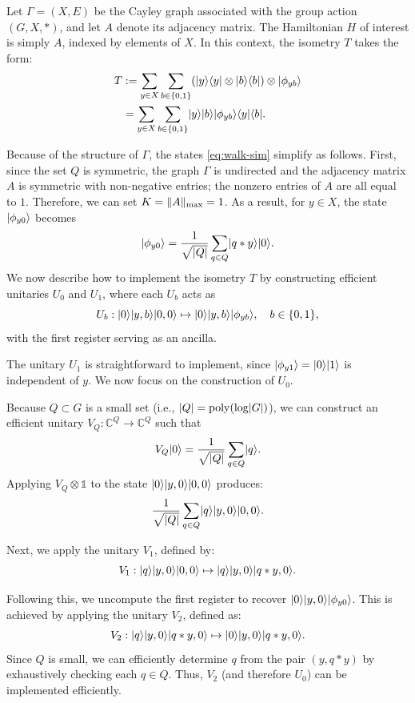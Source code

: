 \documentclass[12pt]{report}
\begin{document}
Let \( \Gamma = (X, E) \) be the Cayley graph associated with the group action \( (G, X, *) \), and let \( A \) denote its adjacency matrix. The Hamiltonian \( H \) of interest is simply \( A \), indexed by elements of \( X \). In this context, the isometry \( T \) takes the form:
\begin{align*}
T
& := \sum_{y \in X} \sum_{b \in \{0, 1\}} (\lvert y\rangle\langle y\rvert \otimes \lvert b\rangle\langle b\rvert) \otimes \lvert\phi_{yb}\rangle \\
& = \sum_{y \in X} \sum_{b \in \{0, 1\}} \lvert y\rangle \lvert b\rangle \lvert\phi_{yb}\rangle \langle y\rvert \langle b\rvert.
\end{align*}


Because of the structure of $\Gamma$, the states \eqref{eq:walk-sim} simplify as follows. First, since the set $Q$ is symmetric, the graph $\Gamma$ is undirected and the adjacency matrix $A$ is symmetric with non-negative entries; the nonzero entries of $A$ are all equal to $1$. Therefore, we can set $K = \lVert A\rVert_{\mathrm{max}} = 1$. As a result, for $y \in X$, the state $\lvert\phi_{y0}\rangle$ becomes
\[ \lvert\phi_{y0}\rangle = \frac{1}{\sqrt{\lvert Q\rvert}} \sum_{q \in Q} \lvert q * y\rangle \lvert0\rangle. \]
We now describe how to implement the isometry \( T \) by constructing efficient unitaries \( U_0 \) and \( U_1 \), where each \( U_b \) acts as
\[
U_b : \lvert0\rangle \lvert y, b\rangle \lvert0, 0\rangle \mapsto \lvert0\rangle \lvert y, b\rangle \lvert\phi_{yb}\rangle, \quad b \in \{0, 1\},
\]
with the first register serving as an ancilla.

The unitary \( U_1 \) is straightforward to implement, since \( \lvert\phi_{y1}\rangle = \lvert0\rangle \lvert1\rangle \) is independent of \( y \). We now focus on the construction of \( U_0 \).

Because \( Q \subset G \) is a small set (i.e., \( \lvert Q\rvert = \operatorname{poly}(\log \lvert G\rvert) \)), we can construct an efficient unitary \( V_Q : \mathbb{C}^Q \to \mathbb{C}^Q \) such that
\[
V_Q \lvert0\rangle = \frac{1}{\sqrt{\lvert Q\rvert}} \sum_{q \in Q} \lvert q\rangle.
\]
Applying \( V_Q \otimes \mathds{1} \) to the state \( \lvert0\rangle \lvert y, 0\rangle \lvert0, 0\rangle \) produces:
\[
\frac{1}{\sqrt{\lvert Q\rvert}} \sum_{q \in Q} \lvert q\rangle \lvert y, 0\rangle \lvert0, 0\rangle.
\]

Next, we apply the unitary \( V_1 \), defined by:
\[
V_1 : \lvert q\rangle \lvert y, 0\rangle \lvert0, 0\rangle \mapsto \lvert q\rangle \lvert y, 0\rangle \lvert q * y, 0\rangle.
\]

Following this, we uncompute the first register to recover \( \lvert0\rangle \lvert y, 0\rangle \lvert\phi_{y0}\rangle \). This is achieved by applying the unitary \( V_2 \), defined as:
\[
V_2 : \lvert q\rangle \lvert y, 0\rangle \lvert q * y, 0\rangle \mapsto \lvert0\rangle \lvert y, 0\rangle \lvert q * y, 0\rangle.
\]
Since \( Q \) is small, we can efficiently determine \( q \) from the pair \( (y, q * y) \) by exhaustively checking each \( q \in Q \). Thus, \( V_2 \) (and therefore \( U_0 \)) can be implemented efficiently.
\end{document}
